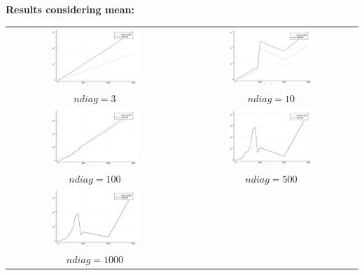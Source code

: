 \documentclass[a4paper,11pt]{article}
\begin{document}
\newpage

\bf{Results considering mean:}\\

\begin{tabular}{cc}
	\includegraphics[width=0.5\textwidth]{perf_mean_3} & 
	\includegraphics[width=0.5\textwidth]{perf_mean_10} \\
	$ndiag = 3$ & $ndiag = 10$\\
	\includegraphics[width=0.5\textwidth]{perf_mean_100} &
	\includegraphics[width=0.5\textwidth]{perf_mean_500} \\
	$ndiag = 100$ & $ndiag = 500$\\
	\includegraphics[width=0.5\textwidth]{perf_mean_1000} & \\
	$ndiag = 1000$ & 
\end{tabular}
\end{document}
